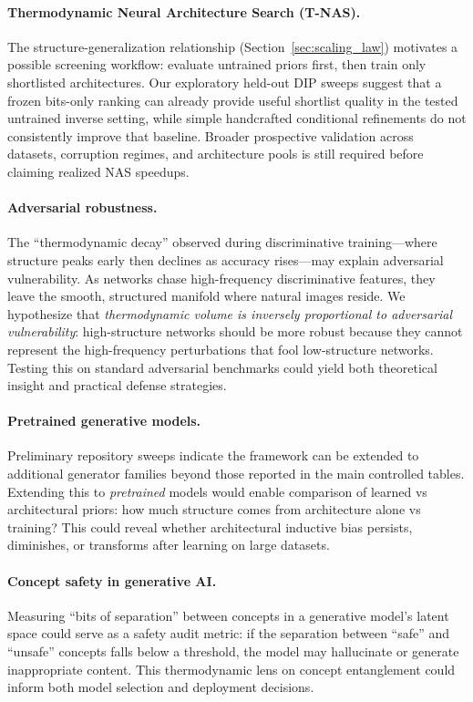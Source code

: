 \documentclass{article}
\begin{document}
\paragraph{Thermodynamic Neural Architecture Search (T-NAS).} The structure-generalization relationship (Section~\ref{sec:scaling_law}) motivates a possible screening workflow: evaluate untrained priors first, then train only shortlisted architectures. Our exploratory held-out DIP sweeps suggest that a frozen bits-only ranking can already provide useful shortlist quality in the tested untrained inverse setting, while simple handcrafted conditional refinements do not consistently improve that baseline. Broader prospective validation across datasets, corruption regimes, and architecture pools is still required before claiming realized NAS speedups.

\paragraph{Adversarial robustness.} The ``thermodynamic decay'' observed during discriminative training---where structure peaks early then declines as accuracy rises---may explain adversarial vulnerability. As networks chase high-frequency discriminative features, they leave the smooth, structured manifold where natural images reside. We hypothesize that \emph{thermodynamic volume is inversely proportional to adversarial vulnerability}: high-structure networks should be more robust because they cannot represent the high-frequency perturbations that fool low-structure networks. Testing this on standard adversarial benchmarks could yield both theoretical insight and practical defense strategies.

\paragraph{Pretrained generative models.} Preliminary repository sweeps indicate the framework can be extended to additional generator families beyond those reported in the main controlled tables. Extending this to \emph{pretrained} models would enable comparison of learned vs architectural priors: how much structure comes from architecture alone vs training? This could reveal whether architectural inductive bias persists, diminishes, or transforms after learning on large datasets.

\paragraph{Concept safety in generative AI.} Measuring ``bits of separation'' between concepts in a generative model's latent space could serve as a safety audit metric: if the separation between ``safe'' and ``unsafe'' concepts falls below a threshold, the model may hallucinate or generate inappropriate content. This thermodynamic lens on concept entanglement could inform both model selection and deployment decisions.
\end{document}
